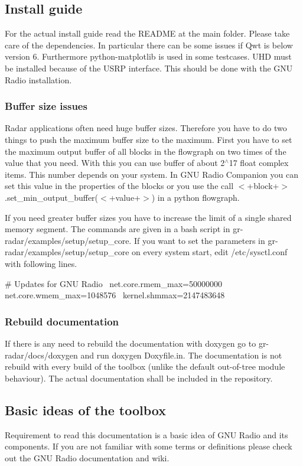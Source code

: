 \subsection{Install guide}\label{index_install}
For the actual install guide read the {\ttfamily R\+E\+A\+D\+ME} at the main folder. Please take care of the dependencies. In particular there can be some issues if Qwt is below version 6. Furthermore python-\/matplotlib is used in some testcases. U\+HD must be installed because of the U\+S\+RP interface. This should be done with the G\+NU Radio installation.\subsubsection{Buffer size issues}\label{index_buffer}
Radar applications often need huge buffer sizes. Therefore you have to do two things to push the maximum buffer size to the maximum. First you have to set the maximum output buffer of all blocks in the flowgraph on two times of the value that you need. With this you can use buffer of about 2$^\wedge$17 float complex items. This number depends on your system. In G\+NU Radio Companion you can set this value in the properties of the blocks or you use the call {\ttfamily $<$+block+$>$.set\+\_\+min\+\_\+output\+\_\+buffer($<$+value+$>$)} in a python flowgraph.

If you need greater buffer sizes you have to increase the limit of a single shared memory segment. The commands are given in a bash script in gr-\/radar/examples/setup/setup\+\_\+core. If you want to set the parameters in gr-\/radar/examples/setup/setup\+\_\+core on every system start, edit /etc/sysctl.conf with following lines.

{\ttfamily \# Updates for G\+NU Radio~\newline
net.\+core.\+rmem\+\_\+max=50000000~\newline
net.\+core.\+wmem\+\_\+max=1048576~\newline
kernel.\+shmmax=2147483648~\newline
}\subsubsection{Rebuild documentation}\label{index_rebuild_doc}
If there is any need to rebuild the documentation with doxygen go to gr-\/radar/docs/doxygen and run {\ttfamily doxygen Doxyfile.\+in}. The documentation is not rebuild with every build of the toolbox (unlike the default out-\/of-\/tree module behaviour). The actual documentation shall be included in the repository.\subsection{Basic ideas of the toolbox}\label{index_basic}
Requirement to read this documentation is a basic idea of G\+NU Radio and its components. If you are not familiar with some terms or definitions please check out the G\+NU Radio documentation and wiki.

